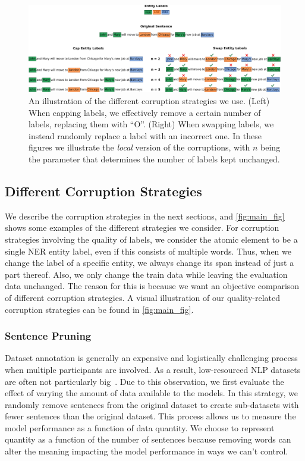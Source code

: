\documentclass{article}
\newcommand{\mike}[1]{\textcolor{red}{#1}}
\begin{document}
\begin{figure}
    \centering
    \includegraphics[width=1\linewidth]{images/diagram.pdf}
    \caption{An illustration of the different corruption strategies we use. (Left) When capping labels, we effectively remove a certain number of labels, replacing them with ``O''. (Right) When swapping labels, we instead randomly replace a label with an incorrect one. In these figures we illustrate the \textit{local} version of the corruptions, with $n$ being the parameter that determines the number of labels kept unchanged.}
    \label{fig:main_fig}
\end{figure}


\subsection{Different Corruption Strategies}
\label{sec:corrupt_strats}
We describe the corruption strategies in the next sections, and \autoref{fig:main_fig} shows some examples of the different strategies we consider. For corruption strategies involving the quality of labels, we consider the atomic element to be a single NER entity label, even if this consists of multiple words. Thus, when we change the label of a specific entity, we always change its span instead of just a part thereof. Also, we only change the train data while leaving the evaluation data unchanged. The reason for this is because we want an objective comparison of different corruption strategies. A visual illustration of our quality-related corruption strategies can be found in \autoref{fig:main_fig}.
\subsubsection{Sentence Pruning}
\label{sec:method:pruning}

Dataset annotation is generally an expensive and logistically challenging process when multiple participants are involved. As a result, low-resourced NLP datasets are often not particularly big~\citep{adelani2021MasakhaNER}. Due to this observation, we first evaluate the effect of varying the amount of data available to the models. In this strategy, we randomly remove sentences from the original dataset to create sub-datasets with fewer sentences than the original dataset. This process allows us to measure the model performance as a function of data quantity. We choose to represent quantity as a function of the number of sentences because removing words can alter the meaning impacting the model performance in ways we can't control.
\end{document}
